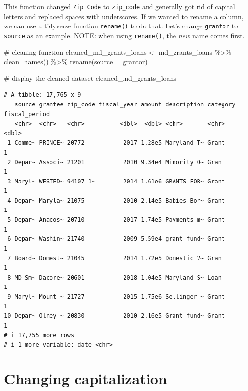 \documentclass[
  letterpaper,
  DIV=11,
  numbers=noendperiod]{scrreprt}
\newenvironment{Shaded}{\begin{snugshade}}{\end{snugshade}}
\newcommand{\AttributeTok}[1]{\textcolor[rgb]{0.40,0.45,0.13}{#1}}
\newcommand{\CommentTok}[1]{\textcolor[rgb]{0.37,0.37,0.37}{#1}}
\newcommand{\FunctionTok}[1]{\textcolor[rgb]{0.28,0.35,0.67}{#1}}
\newcommand{\NormalTok}[1]{\textcolor[rgb]{0.00,0.23,0.31}{#1}}
\newcommand{\OtherTok}[1]{\textcolor[rgb]{0.00,0.23,0.31}{#1}}
\newcommand{\SpecialCharTok}[1]{\textcolor[rgb]{0.37,0.37,0.37}{#1}}
\begin{document}
This function changed \texttt{Zip\ Code} to \texttt{zip\_code} and
generally got rid of capital letters and replaced spaces with
underscores. If we wanted to rename a column, we can use a tidyverse
function \texttt{rename()} to do that. Let's change \texttt{grantor} to
\texttt{source} as an example. NOTE: when using \texttt{rename()}, the
\emph{new} name comes first.

\begin{Shaded}
\begin{Highlighting}[]
\CommentTok{\# cleaning function}
\NormalTok{cleaned\_md\_grants\_loans }\OtherTok{\textless{}{-}}\NormalTok{ md\_grants\_loans }\SpecialCharTok{\%\textgreater{}\%}
  \FunctionTok{clean\_names}\NormalTok{() }\SpecialCharTok{\%\textgreater{}\%} 
  \FunctionTok{rename}\NormalTok{(}\AttributeTok{source =}\NormalTok{ grantor)}

\CommentTok{\# display the cleaned dataset}
\NormalTok{cleaned\_md\_grants\_loans}
\end{Highlighting}
\end{Shaded}

\begin{verbatim}
# A tibble: 17,765 x 9
   source grantee zip_code fiscal_year amount description category fiscal_period
   <chr>  <chr>   <chr>          <dbl>  <dbl> <chr>       <chr>            <dbl>
 1 Comme~ PRINCE~ 20772           2017 1.28e5 Maryland T~ Grant                1
 2 Depar~ Associ~ 21201           2010 9.34e4 Minority O~ Grant                1
 3 Maryl~ WESTED~ 94107-1~        2014 1.61e6 GRANTS FOR~ Grant                1
 4 Depar~ Maryla~ 21075           2010 2.14e5 Babies Bor~ Grant                1
 5 Depar~ Anacos~ 20710           2017 1.74e5 Payments m~ Grant                1
 6 Depar~ Washin~ 21740           2009 5.59e4 grant fund~ Grant                1
 7 Board~ Domest~ 21045           2014 1.72e5 Domestic V~ Grant                1
 8 MD Sm~ Dacore~ 20601           2018 1.04e5 Maryland S~ Loan                 1
 9 Maryl~ Mount ~ 21727           2015 1.75e6 Sellinger ~ Grant                1
10 Depar~ Olney ~ 20830           2010 2.16e5 Grant fund~ Grant                1
# i 17,755 more rows
# i 1 more variable: date <chr>
\end{verbatim}

\hypertarget{changing-capitalization}{%
\section{Changing capitalization}\label{changing-capitalization}}
\end{document}
